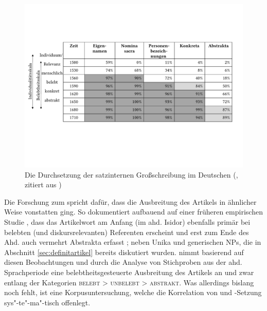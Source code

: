 \begin{figure}
\includegraphics[width=\textwidth]{images/Substantivgrossschreibung.pdf}
\caption {Die Durchsetzung der satzinternen Großschreibung im Deutschen (\citealt{Bergmann1999}, zitiert aus \citealt[351]{Szczepaniak2011})\label{sgs}}
\end{figure} 

Die Forschung zum  spricht dafür, dass die Ausbreitung des Artikels in ähnlicher Weise vonstatten ging. So dokumentiert \textcite[]{Oubouzar1992} aufbauend auf einer früheren empirischen Studie \parencite{Oubouzar1989}, dass das  Artikelwort  am Anfang (im ahd. Isidor) ebenfalls primär bei belebten  (und diskursrelevanten) Referenten erscheint \parencite[vgl. insbesondere][566--567]{Oubouzar1989} und erst zum Ende des Ahd. auch vermehrt Abstrakta  erfasst \parencite[][572]{Oubouzar1989}; neben Unika  und generischen   NPs, die in Abschnitt \ref{sec:definitartikel} bereits diskutiert wurden. \textcite[73--78]{Szczepaniak2011} nimmt basierend auf diesen Beobachtungen und durch die Analyse von Stichproben aus der ahd. Sprachperiode eine belebtheitsgesteuerte  Ausbreitung  des Artikels an und zwar entlang der Kategorien \textsc{belebt > unbelebt > abstrakt}. Was allerdings bislang noch fehlt, ist eine  Korpusuntersuchung, welche die Korrelation von  und -Setzung sys"-te"-ma"-tisch offenlegt. 

